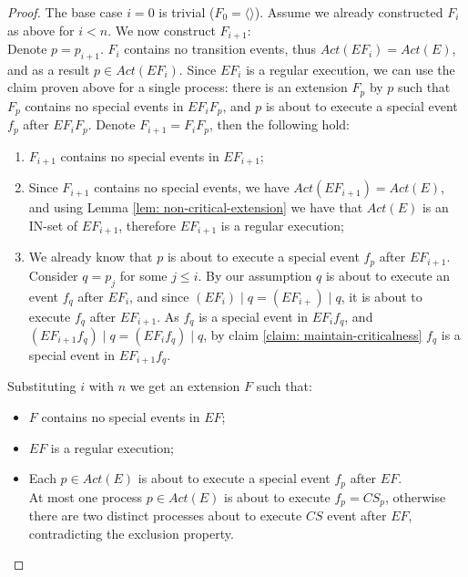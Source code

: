 \begin{proof}
	The base case $i=0$ is trivial ($F_0 = \langle \rangle$). Assume we already constructed $F_i$ as above for $i < n$. We now construct $F_{i+1}$:
	\\ Denote $p = p_{i+1}$. $F_i$ contains no transition events, thus $Act(E F_i) = Act(E)$, and as a result $p \in Act(E F_i)$. Since $E F_i$ is a regular execution, we can use the claim proven above for a single process: there is an extension $F_p$ by $p$ such that $F_p$ contains no special events in $E F_i F_p$, and $p$ is about to execute a special event $f_p$ after $E F_i F_p$. Denote $F_{i+1} = F_i F_p$, then the following hold:
	\begin{enumerate}
		\item $F_{i+1}$ contains no special events in $E F_{i+1}$;
		\item Since $F_{i+1}$ contains no special events, we have $Act(E F_{i+1}) = Act(E)$, and using Lemma \ref{lem: non-critical-extension} we have that $Act(E)$ is an IN-set of $E F_{i+1}$, therefore $E F_{i+1}$ is a regular execution;
		\item We already know that $p$ is about to execute a special event $f_p$ after $E F_{i+1}$. Consider $q = p_j$ for some $j \leq i$. By our assumption $q$ is about to execute an event $f_q$ after $E F_i$, and since $(E F_i) \mid q = (E F_{i+}) \mid q$, it is about to execute $f_q$ after $E F_{i+1}$. As $f_q$ is a special event in $E F_i f_q$, and $(E F_{i+1} f_q) \mid q = (E F_i f_q) \mid q$, by claim \ref{claim: maintain-criticalness} $f_q$ is a special event in $E F_{i+1} f_q$.
	\end{enumerate}
	
	Substituting $i$ with $n$ we get an extension $F$ such that:
	\begin{itemize}
		\item $F$ contains no special events in $E F$;
		\item $E F$ is a regular execution;
		\item Each $p \in Act(E)$ is about to execute a special event $f_p$ after $E F$.
		\\ At most one process $p \in Act(E)$ is about to execute $f_p = CS_p$, otherwise there are two distinct processes about to execute $CS$ event after $E F$, contradicting the exclusion property.
	\end{itemize}
\end{proof}


